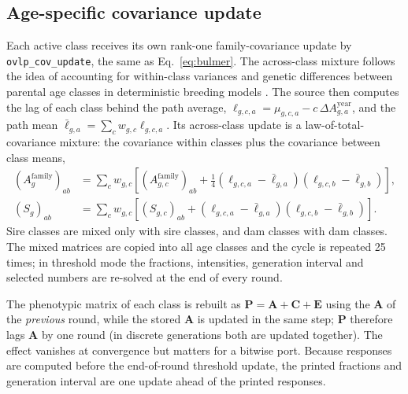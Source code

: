 \documentclass[11pt]{article}
\newcommand{\src}[1]{\texttt{#1}}
\newcommand{\ma}[1]{\mathbf{#1}}
\begin{document}
\subsection{Age-specific covariance update}
Each active class receives its own rank-one family-covariance update by \src{ovlp\_cov\_update}, the same as Eq.~\eqref{eq:bulmer}. The across-class mixture follows the idea of accounting for within-class variances and genetic differences between parental age classes in deterministic breeding models \cite{meuwissen1989}. The source then computes the lag of each class behind the path average,
$\ell_{g,c,a}=\mu_{g,c,a}-c\,\Delta A_{g,a}^{\mathrm{year}}$, and the path mean $\bar\ell_{g,a}=\sum_cw_{g,c}\ell_{g,c,a}$. Its across-class update is a law-of-total-covariance mixture: the covariance within classes plus the covariance between class means,
\begin{align}\label{eq:agemixture}
(A_g^{\mathrm{family}})_{ab}&=\sum_cw_{g,c}\left[(A_{g,c}^{\mathrm{family}})_{ab}
+\tfrac14(\ell_{g,c,a}-\bar\ell_{g,a})(\ell_{g,c,b}-\bar\ell_{g,b})\right],\\
(S_g)_{ab}&=\sum_cw_{g,c}\left[(S_{g,c})_{ab}
+(\ell_{g,c,a}-\bar\ell_{g,a})(\ell_{g,c,b}-\bar\ell_{g,b})\right].\nonumber
\end{align}
Sire classes are mixed only with sire classes, and dam classes with dam classes. The mixed matrices are copied into all age classes and the cycle is repeated 25 times; in threshold mode the fractions, intensities, generation interval and selected numbers are re-solved at the end of every round.

\begin{codenote}
The phenotypic matrix of each class is rebuilt as $\ma P=\ma A+\ma C+\ma E$ using the $\ma A$ of the \emph{previous} round, while the stored $\ma A$ is updated in the same step; $\ma P$ therefore lags $\ma A$ by one round (in discrete generations both are updated together). The effect vanishes at convergence but matters for a bitwise port. Because responses are computed before the end-of-round threshold update, the printed fractions and generation interval are one update ahead of the printed responses.
\end{codenote}

\end{document}
